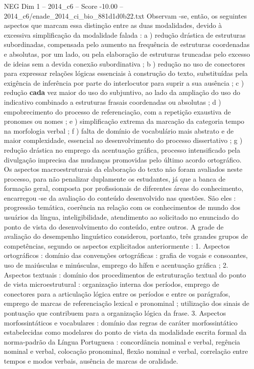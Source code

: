 \begin{textsample}{NEG Dim 1 – 2014\_c6 – Score -10.00 – 2014\_c6/enade\_2014\_ci\_bio\_881d1d0b22.txt}
Observam -se, então, os seguintes aspectos que marcam essa distinção entre as duas modalidades, devido à excessiva simplificação da modalidade falada : a ) redução drástica de estruturas subordinadas, compensada pelo aumento na frequência de estruturas coordenadas e absolutas, por um lado, ou pela elaboração de estruturas truncadas pelo excesso de ideias sem a devida conexão subordinativa ; b ) redução no uso de conectores para expressar relações lógicas essenciais à construção do texto, substituídas pela exigência de inferência por parte do interlocutor para suprir a sua ausência ; c ) redução \textbf{cada} vez maior do uso do subjuntivo, ao lado da ampliação do uso do indicativo combinado a estruturas frasais coordenadas ou absolutas ; d ) empobrecimento do processo de referenciação, com a repetição exaustiva de pronomes ou nomes ; e ) simplificação extrema da marcação da categoria tempo na morfologia verbal ; f ) falta de domínio de vocabulário mais abstrato e de maior complexidade, essencial ao desenvolvimento do processo dissertativo ; g ) redução drástica no emprego da acentuação gráfica, processo intensificado pela divulgação imprecisa das mudanças promovidas pelo último acordo ortográfico.
Os aspectos macroestruturais da elaboração do texto não foram avaliados neste processo, para não penalizar duplamente os estudantes, já que a banca de formação geral, composta por profissionais de diferentes áreas do conhecimento, encarregou -se da avaliação do conteúdo desenvolvido nas questões.
São eles : progressão temática, coerência na relação com os conhecimentos de mundo dos usuários da língua, inteligibilidade, atendimento ao solicitado no enunciado do ponto de vista do desenvolvimento do conteúdo, entre outros.
A grade de avaliação do desempenho linguístico considerou, portanto, três grandes grupos de competências, segundo os aspectos explicitados anteriormente : 1.
Aspectos ortográficos : domínio das convenções ortográficas : grafia de vogais e consoantes, uso de maiúsculas e minúsculas, emprego do hífen e acentuação gráfica ; 2.
Aspectos textuais : domínio dos procedimentos de estruturação textual do ponto de vista microestrutural : organização interna dos períodos, emprego de conectores para a articulação lógica entre os períodos e entre os parágrafos, emprego de marcas de referenciação lexical e pronominal ; utilização dos sinais de pontuação que contribuem para a organização lógica da frase. 3.
Aspectos morfossintáticos e vocabulares : domínio das regras de caráter morfossintático estabelecidas como modelares do ponto de vista da modalidade escrita formal da norma-padrão da Língua Portuguesa : concordância nominal e verbal, regência nominal e verbal, colocação pronominal, flexão nominal e verbal, correlação entre tempos e modos verbais, ausência de marcas de oralidade.

\end{textsample}
